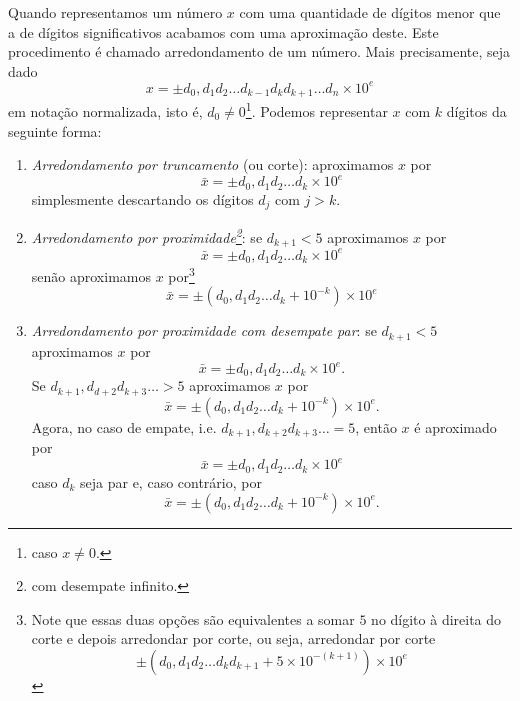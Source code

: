 Quando representamos um número $x$ com uma quantidade de dígitos menor que a de dígitos significativos acabamos com uma aproximação deste. Este procedimento é chamado arredondamento de um número. Mais precisamente, seja dado
\begin{equation}
  x = \pm d_0,d_1d_2\ldots d_{k-1}d_kd_{k+1}\ldots d_n \times 10^e
\end{equation}
em notação normalizada, isto é, $d_0\neq 0$\footnote{caso $x\neq 0$.}. Podemos representar $x$ com $k$ dígitos da seguinte forma:
\begin{enumerate}
\item \emph{Arredondamento por truncamento} (ou corte): aproximamos $x$ por
\begin{equation}
  \bar{x} = \pm d_{0},d_{1}d_{2}\ldots d_{k}\times 10^e
\end{equation}
simplesmente descartando os dígitos $d_{j}$ com $j > k$.
\item \emph{Arredondamento por proximidade\footnote{com desempate infinito.}}: se $d_{k+1}<5$ aproximamos $x$ por
\begin{equation}
  \bar{x} = \pm d_0,d_1d_2\ldots d_{k}\times 10^{e}
\end{equation}
senão aproximamos $x$ por\footnote{Note que essas duas opções são equivalentes a somar $5$ no dígito à direita do corte e depois arredondar por corte, ou seja, arredondar por corte
\begin{equation}  \pm(d_0,d_1d_2\ldots d_kd_{k+1}+ 5 \times10^{-(k+1)} )\times 10^{e}  \end{equation}}
\begin{equation}
 \bar{x} = \pm (d_0,d_1d_2\ldots d_{k} + 10^{-k}) \times 10^{e}
\end{equation}
\item \emph{Arredondamento por proximidade com desempate par}: se $d_{k+1}<5$ aproximamos $x$ por
\begin{equation}
  \bar{x} = \pm d_0,d_1d_2\ldots d_{k}\times 10^{e}.
\end{equation}
Se $d_{k+1},d_{d+2}d_{k+3}\ldots>5$ aproximamos $x$ por
\begin{equation}
 \bar{x} = \pm (d_0,d_1d_2\ldots d_{k} + 10^{-k}) \times 10^{e}.
\end{equation}
Agora, no caso de empate, i.e. $d_{k+1},d_{k+2}d_{k+3}\ldots = 5$, então $x$ é aproximado por
\begin{equation}
  \bar{x} = \pm d_0,d_1d_2\ldots d_{k}\times 10^{e}
\end{equation}
caso $d_{k}$ seja par e, caso contrário, por
\begin{equation}
 \bar{x} = \pm (d_0,d_1d_2\ldots d_{k} + 10^{-k}) \times 10^{e}.
\end{equation}
\end{enumerate}

